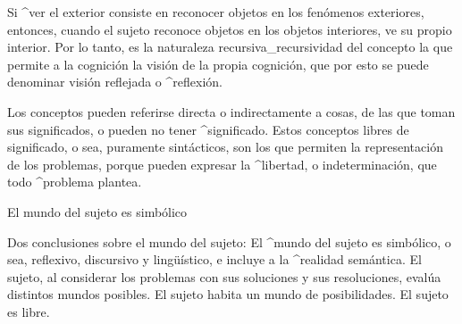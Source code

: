 Si ^{ver} el exterior consiste en reconocer objetos en los fenómenos
exteriores, entonces, cuando el sujeto reconoce objetos en los objetos
interiores, ve su propio interior. Por lo tanto, es la naturaleza
recursiva_{recursividad} del concepto la que permite a la cognición la
visión de la propia cognición, que por esto se puede denominar visión
reflejada o ^{reflexión}.

Los conceptos pueden referirse directa o indirectamente a cosas, de las
que toman sus significados, o pueden no tener ^{significado}. Estos
conceptos libres de significado, o sea, puramente sintácticos, son los
que permiten la representación de los problemas, porque pueden expresar
la ^{libertad}, o indeterminación, que todo ^{problema} plantea.


\Section El mundo del sujeto es simbólico

Dos conclusiones sobre el mundo del sujeto:
\beginpoints
\point El ^{mundo} del sujeto es simbólico, o sea, reflexivo, discursivo y
lingüístico, e incluye a la ^{realidad} semántica.
\point El sujeto, al considerar los problemas con sus soluciones y sus
resoluciones, evalúa distintos mundos posibles. El sujeto habita un
mundo de posibilidades. El sujeto es libre.
\endpoints


\endinput
